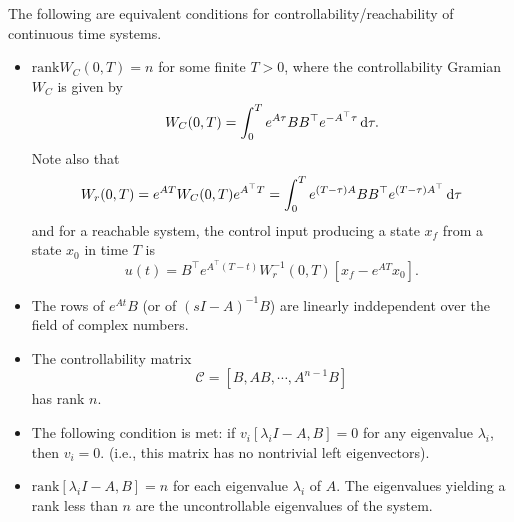 \documentclass{report}
\begin{document}
The following are equivalent conditions for
controllability/reachability of continuous time systems.
\begin{itemize}
  \item{
    $\mathrm{rank} W_C(0, T) = n$ for some finite $T > 0$,
    where the controllability Gramian $W_C$ is given by
    $$
    W_C(0, T) = \int_0^T e^{A \tau} B B^\top e^{-A^\top \tau} \dif \tau.
    $$
    Note also that
    $$
    W_r(0, T)
    = e^{A T} W_C(0, T) e^{A^\top T}
    = \int_0^T e^{(T - \tau)A} B B^\top e^{(T - \tau)A^\top} \dif \tau
    $$
    and for a reachable system, the control input producing a state $x_f$
    from a state $x_0$ in time $T$ is
    $$
    u(t) =
    B^\top e^{A^\top(T - t)} W_r^{-1}(0, T) [x_f - e^{A T} x_0].
    $$
  }
  \item{
    The rows of $e^{A t} B$ (or of $(sI - A)^{-1} B$) are linearly
    inddependent over the field of complex numbers.
  }
  \item{
    The controllability matrix
    $$
    \mathcal{C} = [B, A B, \cdots, A^{n-1} B]
    $$
    has rank $n$.
  }
  \item{
   The following condition is met: if $v_i [ \lambda_i I - A, B ] = 0$
   for any eigenvalue $\lambda_i$, then $v_i = 0$. (i.e., this matrix
   has no nontrivial left eigenvectors).
  }
  \item{
    $\mathrm{rank} [ \lambda_i I - A, B ] = n$ for each eigenvalue $\lambda_i$
    of $A$. The eigenvalues yielding a rank less than $n$ are the
    uncontrollable eigenvalues of the system.
  }
\end{itemize}
\end{document}
